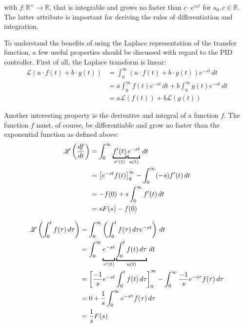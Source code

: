 with $f: \mathbb{R}^+ \to \mathbb{R}$, that is integrable and grows no faster than $c \cdot e^{s_0t}$ for $s_0, c \in \mathbb{R}$. The latter attribute is important for deriving the rules of differentiation and integration.

To understand the benefits of using the Laplace representation of the transfer function, a few useful properties should be discussed with regard to the PID controller. First of all, the Laplace transform is linear:
\begin{align}
    \mathscr{L}\left(a \cdot f(t) + b \cdot g(t) \right) &= \int_0^\infty (a \cdot f(t) + b \cdot g(t)) e^{-st}\,dt \nonumber\\
    &= a \int_0^\infty f(t) e^{-st}\,dt + b \int_0^\infty g(t) e^{-st}\,dt \nonumber\\
    &= a \mathscr{L}\left(f(t)\right) + b \mathscr{L}\left(g(t)\right)
\end{align}

Another interesting property is the derivative and integral of a function $f$. The function $f$ must, of course, be differentiable and grow no faster than the exponential function as defined above:
\begin{align}
    \mathscr{L}\left(\frac{df}{dt}\right) &= \int_0^\infty \underbracket{f'(t)}_{v'(t)} \underbracket{\vphantom{f'(t)}e^{-st}}_{u(t)}\,dt \nonumber\\
    &= \left[e^{-st} f(t) \right]_0^\infty - \int_0^\infty (-s)f'(t)\,dt \nonumber\\
    &= -f(0) + s \int_0^\infty f'(t)\,dt \nonumber\\
    &= s F(s) - f(0)
\end{align}

\begin{align}
    \mathscr{L} \left( \int_0^t f(\tau)\,d\tau \right) &= \int_0^\infty \left(\int_0^t f(\tau)\,d\tau e^{-st} \right)\,dt \nonumber\\
    &= \int_0^\infty \underbracket{e^{-st}\vphantom{\int_0^t}}_{v'(t)} \underbracket{\int_0^t f(t)\,d\tau}_{u(t)}\,dt \nonumber\\
    &= \left[\frac{-1}{s} e^{-st} \int_0^t f(t)\,d\tau \right]_0^\infty - \int_0^\infty \frac{-1}{s} e^{-s\tau} f(\tau)\,d\tau \nonumber\\
    &= 0 + \frac{1}{s} \int_0^\infty e^{-s\tau} f(\tau)\,d\tau \nonumber\\
    &= \frac{1}{s} F(s) \label{eqn:lapace_integration}
\end{align}

